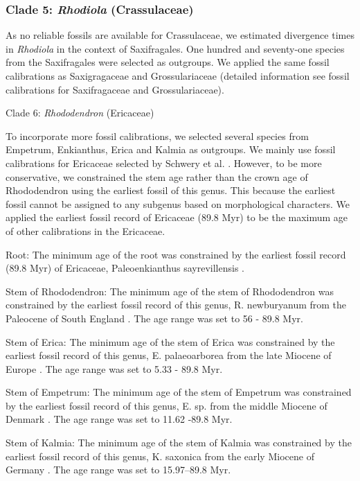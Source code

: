 \documentclass[10pt]{article}
\begin{document}
\subsubsection{Clade 5: \textit{Rhodiola} (Crassulaceae)}

As no reliable fossils are available for Crassulaceae, we estimated
divergence times in \textit{Rhodiola} in the context of
Saxifragales. One hundred and seventy-one species from the
Saxifragales were selected as outgroups. We applied the same fossil
calibrations as Saxigragaceae and Grossulariaceae (detailed
information see fossil calibrations for Saxifragaceae and
Grossulariaceae).

Clade 6: \textit{Rhododendron} (Ericaceae)

To incorporate more fossil calibrations, we selected several species
from Empetrum, Enkianthus, Erica and Kalmia as outgroups.  We mainly
use fossil calibrations for Ericaceae selected by Schwery et
al. \citep{Schwery, Onstein et al. 2015}. However, to be more
conservative, we constrained the stem age rather than the crown age of
Rhododendron using the earliest fossil of this genus. This because the
earliest fossil cannot be assigned to any subgenus based on
morphological characters. We applied the earliest fossil record of
Ericaceae (89.8 Myr) to be the maximum age of other calibrations in
the Ericaceae.

Root: The minimum age of the root was constrained by the earliest
fossil record (89.8 Myr) of Ericaceae, Paleoenkianthus sayrevillensis
\citep{Nixon and Crepet 1993}. 

Stem of Rhododendron: The minimum age of the stem of Rhododendron was
constrained by the earliest fossil record of this genus,
R. newburyanum from the Paleocene of South England \citep{Collinson
  and Crane 1978}. The age range was set to 56 - 89.8 Myr.

Stem of Erica: The minimum age of the stem of Erica was constrained by
the earliest fossil record of this genus, E. palaeoarborea from the
late Miocene of Europe \citep{Van der Burgh 1987}. The age range was
set to 5.33 - 89.8 Myr. 

Stem of Empetrum: The minimum age of the stem of Empetrum was
constrained by the earliest fossil record of this genus, E. sp. from
the middle Miocene of Denmark \citep{Friis 1979}. The age range was
set to 11.62 -89.8 Myr. 

Stem of Kalmia: The minimum age of the stem of Kalmia was constrained
by the earliest fossil record of this genus, K. saxonica from the
early Miocene of Germany \citep{Van der Burgh 1987}. The age range was
set to 15.97--89.8 Myr.
\end{document}
